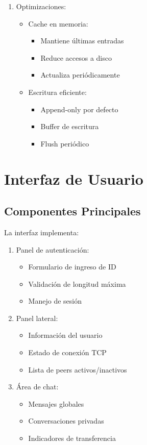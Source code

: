 \documentclass[12pt]{article}
\begin{document}
\begin{enumerate}
    \item Optimizaciones:
    \begin{itemize}
        \item Cache en memoria:
        \begin{itemize}
            \item Mantiene últimas entradas
            \item Reduce accesos a disco
            \item Actualiza periódicamente
        \end{itemize}
        \item Escritura eficiente:
        \begin{itemize}
            \item Append-only por defecto
            \item Buffer de escritura
            \item Flush periódico
        \end{itemize}
    \end{itemize}
\end{enumerate}

\section{Interfaz de Usuario}
\subsection{Componentes Principales}
La interfaz implementa:

\begin{enumerate}
    \item Panel de autenticación:
    \begin{itemize}
        \item Formulario de ingreso de ID
        \item Validación de longitud máxima
        \item Manejo de sesión
    \end{itemize}
    \item Panel lateral:
    \begin{itemize}
        \item Información del usuario
        \item Estado de conexión TCP
        \item Lista de peers activos/inactivos
    \end{itemize}
    \item Área de chat:
    \begin{itemize}
        \item Mensajes globales
        \item Conversaciones privadas
        \item Indicadores de transferencia
    \end{itemize}
\end{enumerate}
\end{document}
